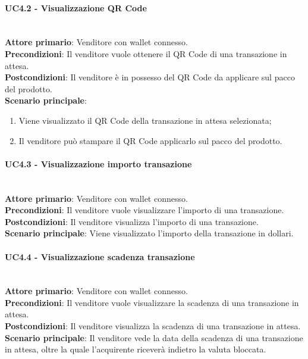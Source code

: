 \documentclass[a4paper, 12pt]{article}
\begin{document}
\paragraph{UC4.2 - Visualizzazione QR Code}\\
\textbf{Attore primario}: Venditore con wallet connesso.\\
\textbf{Precondizioni}: Il venditore vuole ottenere il QR Code di una transazione in attesa.\\
\textbf{Postcondizioni}: Il venditore è in possesso del QR Code da applicare sul pacco del prodotto.\\
\textbf{Scenario principale}:
\begin{enumerate}
\item Viene visualizzato il QR Code della transazione in attesa selezionata;
\item Il venditore può stampare il QR Code applicarlo sul pacco del prodotto.
\end{enumerate}

\paragraph{UC4.3 - Visualizzazione importo transazione}\\
\textbf{Attore primario}: Venditore con wallet connesso.\\
\textbf{Precondizioni}: Il venditore vuole visualizzare l'importo di una transazione.\\
\textbf{Postcondizioni}: Il venditore visualizza l'importo di una transazione.\\
\textbf{Scenario principale}: Viene visualizzato l'importo della transazione in dollari.\\

\paragraph{UC4.4 - Visualizzazione scadenza transazione}\\
\textbf{Attore primario}: Venditore  con wallet connesso.\\
\textbf{Precondizioni}: Il venditore vuole visualizzare la scadenza di una transazione in attesa.\\
\textbf{Postcondizioni}: Il venditore visualizza la scadenza di una transazione in attesa.\\
\textbf{Scenario principale}: Il venditore vede la data della scadenza di una transazione in attesa, oltre la quale l'acquirente riceverà indietro la valuta bloccata.\\
\end{document}
